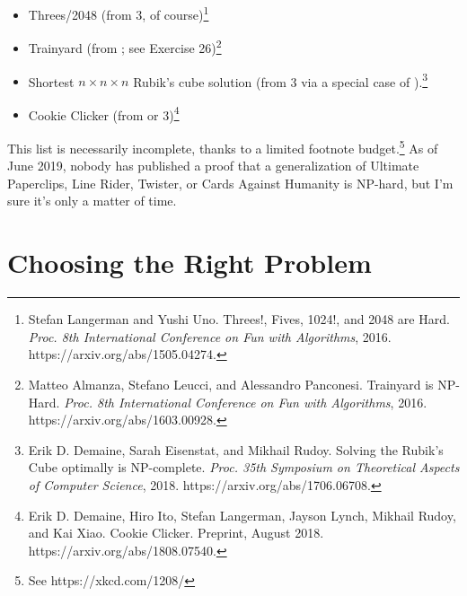 \begin{itemize}
\item Threes/2048 (from 3, of course)\footnote{Stefan Langerman and Yushi Uno. Threes!, Fives, 1024!, and 2048 are Hard. \textit{Proc. 8th International Conference on Fun with Algorithms}, 2016. https://arxiv.org/abs/1505.04274.}
\item Trainyard (from ; see Exercise 26)\footnote{Matteo Almanza, Stefano Leucci, and Alessandro Panconesi. Trainyard is NP-Hard. \textit{Proc. 8th International Conference on Fun with Algorithms}, 2016. https://arxiv.org/abs/1603.00928.}
\item Shortest $n \times n \times n$ Rubik’s cube solution (from 3 via a special case of ).\footnote{Erik D. Demaine, Sarah Eisenstat, and Mikhail Rudoy. Solving the Rubik’s Cube optimally is NP-complete. \textit{Proc. 35th Symposium on Theoretical Aspects of Computer Science}, 2018. https://arxiv.org/abs/1706.06708.}
\item Cookie Clicker (from  or 3)\footnote{Erik D. Demaine, Hiro Ito, Stefan Langerman, Jayson Lynch, Mikhail Rudoy, and Kai Xiao. Cookie Clicker. Preprint, August 2018. https://arxiv.org/abs/1808.07540.}
\end{itemize}
This list is necessarily incomplete, thanks to a limited footnote budget.\footnote{See https://xkcd.com/1208/}
As of June 2019, nobody has published a proof that a generalization of Ultimate Paperclips, Line Rider, Twister, or Cards Against Humanity is NP-hard, but I’m sure it’s only a matter of time.

\section{Choosing the Right Problem}
\label{sec:12.14}

